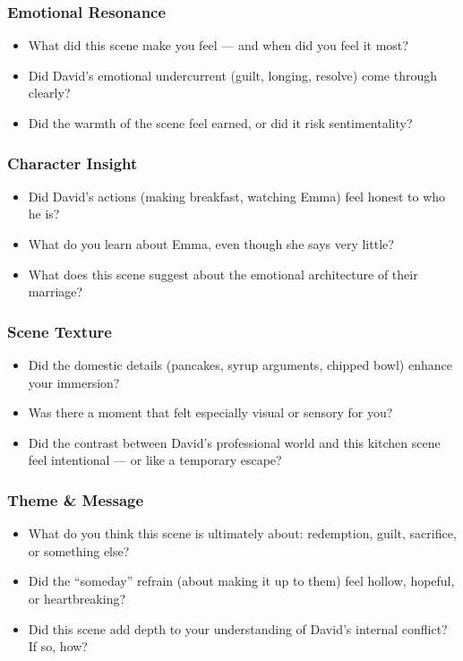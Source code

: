 \subsubsection*{Emotional Resonance}

\begin{itemize}
  \item What did this scene make you feel — and when did you feel it most?
  \item Did David’s emotional undercurrent (guilt, longing, resolve) come through clearly?
  \item Did the warmth of the scene feel earned, or did it risk sentimentality?
\end{itemize}

\subsubsection*{Character Insight}

\begin{itemize}
  \item Did David’s actions (making breakfast, watching Emma) feel honest to who he is?
  \item What do you learn about Emma, even though she says very little?
  \item What does this scene suggest about the emotional architecture of their marriage?
\end{itemize}

\subsubsection*{Scene Texture}

\begin{itemize}
  \item Did the domestic details (pancakes, syrup arguments, chipped bowl) enhance your immersion?
  \item Was there a moment that felt especially visual or sensory for you?
  \item Did the contrast between David’s professional world and this kitchen scene feel intentional — or like a temporary escape?
\end{itemize}

\subsubsection*{Theme \& Message}

\begin{itemize}
  \item What do you think this scene is ultimately about: redemption, guilt, sacrifice, or something else?
  \item Did the “someday” refrain (about making it up to them) feel hollow, hopeful, or heartbreaking?
  \item Did this scene add depth to your understanding of David’s internal conflict? If so, how?
\end{itemize}

